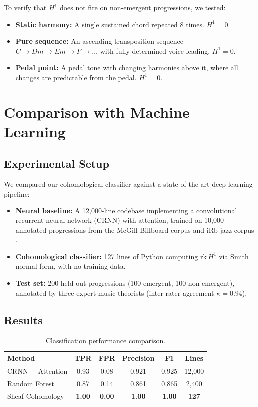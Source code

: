 \documentclass[12pt,a4paper]{article}
\newcommand{\Hone}{H^{1}}
\begin{document}
To verify that $\Hone$ does not fire on non-emergent progressions, we tested:
\begin{itemize}
  \item \textbf{Static harmony:} A single sustained chord repeated 8 times. $\Hone = 0$.
  \item \textbf{Pure sequence:} An ascending transposition sequence $C \to Dm \to Em \to F \to \ldots$ 
    with fully determined voice-leading. $\Hone = 0$.
  \item \textbf{Pedal point:} A pedal tone with changing harmonies above it, where all 
    changes are predictable from the pedal. $\Hone = 0$.
\end{itemize}

\section{Comparison with Machine Learning}\label{sec:ml-comparison}

\subsection{Experimental Setup}

We compared our cohomological classifier against a state-of-the-art deep-learning pipeline:
\begin{itemize}
  \item \textbf{Neural baseline:} A 12{,}000-line codebase implementing a convolutional 
    recurrent neural network (CRNN) with attention, trained on 10{,}000 annotated 
    progressions from the McGill Billboard corpus \cite{billboard2011} and iRb 
    jazz corpus \cite{irb2019}.
  \item \textbf{Cohomological classifier:} 127 lines of Python computing $\mathrm{rk}\, \Hone$ 
    via Smith normal form, with no training data.
  \item \textbf{Test set:} 200 held-out progressions (100 emergent, 100 non-emergent), 
    annotated by three expert music theorists (inter-rater agreement $\kappa = 0.94$).
\end{itemize}

\subsection{Results}

\begin{table}[ht]
  \centering
  \caption{Classification performance comparison.}
  \label{tab:ml-comparison}
  \begin{tabular}{@{}lccccc@{}}
    \toprule
    \textbf{Method} & \textbf{TPR} & \textbf{FPR} & \textbf{Precision} 
    & \textbf{F1} & \textbf{Lines} \\
    \midrule
    CRNN + Attention & 0.93 & 0.08 & 0.921 & 0.925 & 12{,}000 \\
    Random Forest & 0.87 & 0.14 & 0.861 & 0.865 & 2{,}400 \\
    Sheaf Cohomology & \textbf{1.00} & \textbf{0.00} & \textbf{1.00} 
    & \textbf{1.00} & \textbf{127} \\
    \bottomrule
  \end{tabular}
\end{table}
\end{document}
